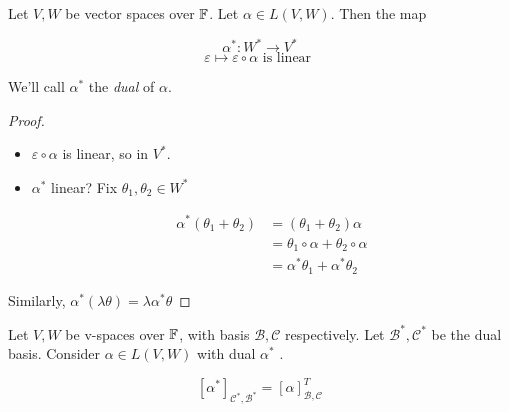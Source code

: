 \documentclass[a4paper]{article}
\begin{document}
\begin{lemma} 
	Let $ V,W $ be vector spaces over $ \mathbb{F} $. Let $ \alpha \in L(V,W) $. Then the map 
	
	\[ \alpha^{*} : W^{*} \to V^{*} \]
	\[ \varepsilon \mapsto \varepsilon \circ \alpha \text{ is linear } \]
	
	
	We'll call $ \alpha^{*} $ the \emph{dual} of $ \alpha $.
	
	
\end{lemma}


\begin{proof}
	\begin{itemize}
		\item $ \varepsilon \circ \alpha $ is linear, so in $ V^{*} $.
		\item $ \alpha^{*} $ linear? Fix $ \theta_{1},\theta_{2} \in W^{*} $
		
		\begin{align*}
		\alpha^{*}(\theta_{1} + \theta_{2}) & = (\theta_{1} + \theta_{2})\alpha \\
		& = \theta_{1} \circ \alpha + \theta_{2} \circ \alpha \\
		& = \alpha^{*} \theta_{1} + \alpha^{*} \theta_{2}
		\end{align*} 
	\end{itemize}
Similarly, $ \alpha^{*}(\lambda \theta)  = \lambda \alpha^{*} \theta $
\end{proof}


\begin{prop} 
	Let $ V,W $ be v-spaces over $ \mathbb{F} $, with basis $ \mathcal{B},\mathcal{C} $ respectively. Let $ \mathcal{B}^{*},\mathcal{C}^{*} $ be the dual basis. Consider $ \alpha \in L(V,W) $ with dual $ \alpha^{*} $ .
	
	
	\[ [\alpha^{*}]_{\mathcal{C}^{*},\mathcal{B}^{*}} = [\alpha]_{\mathcal{B},\mathcal{C}}^{T} \]
\end{prop}
\end{document}
